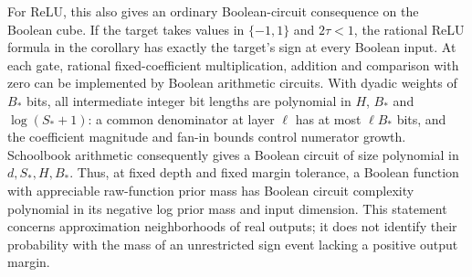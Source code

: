 For ReLU, this also gives an ordinary Boolean-circuit consequence on the Boolean cube. If the target takes values in $\{-1,1\}$ and $2\tau<1$, the rational ReLU formula in the corollary has exactly the target's sign at every Boolean input. At each gate, rational fixed-coefficient multiplication, addition and comparison with zero can be implemented by Boolean arithmetic circuits. With dyadic weights of $B_*$ bits, all intermediate integer bit lengths are polynomial in $H$, $B_*$ and $\log(S_*+1)$: a common denominator at layer $\ell$ has at most $\ell B_*$ bits, and the coefficient magnitude and fan-in bounds control numerator growth. Schoolbook arithmetic consequently gives a Boolean circuit of size polynomial in $d,S_*,H,B_*$. Thus, at fixed depth and fixed margin tolerance, a Boolean function with appreciable raw-function prior mass has Boolean circuit complexity polynomial in its negative log prior mass and input dimension. This statement concerns approximation neighborhoods of real outputs; it does not identify their probability with the mass of an unrestricted sign event lacking a positive output margin.
